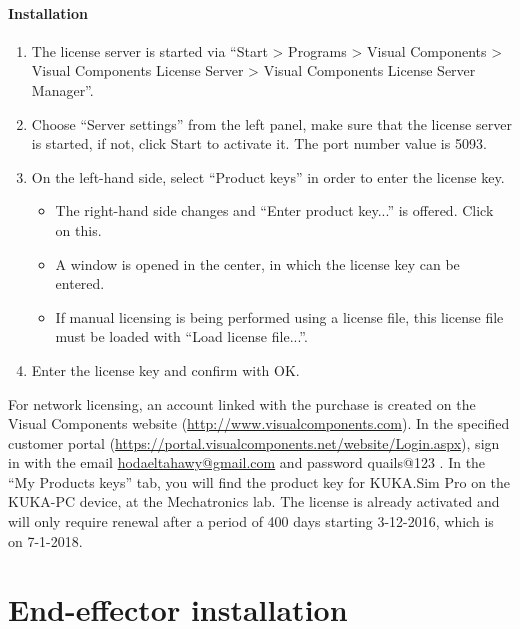 			\paragraph{Installation}
				\begin{enumerate}
					\item The license server is started via “Start > Programs > Visual Components > Visual Components License Server > Visual Components License Server Manager”.
					\item Choose “Server settings” from the left panel, make sure that the license server is started, if not, click Start to activate it. The port number value is 5093.
					\item On the left-hand side, select “Product keys” in order to enter the license key.
						\begin{itemize}
							\item The right-hand side changes and “Enter product key...” is offered. Click on this.
							\item A window is opened in the center, in which the license key can be entered.
							\item If manual licensing is being performed using a license file, this license file must be loaded with “Load license file...”.
						\end{itemize}
					\item Enter the license key and confirm with OK.
				\end{enumerate}
			
			For network licensing, an account linked with the purchase is created on the Visual Components website (\url{http://www.visualcomponents.com}). In the specified customer portal (\url{https://portal.visualcomponents.net/website/Login.aspx}), sign in with the email \url{hodaeltahawy@gmail.com} and password quails@123 . In the “My Products keys” tab, you will find the product key for KUKA.Sim Pro on the KUKA-PC device, at the Mechatronics lab. The license is already activated and will only require renewal after a period of 400 days starting 3-12-2016, which is on 7-1-2018. 

\newpage
\section{End-effector installation}
